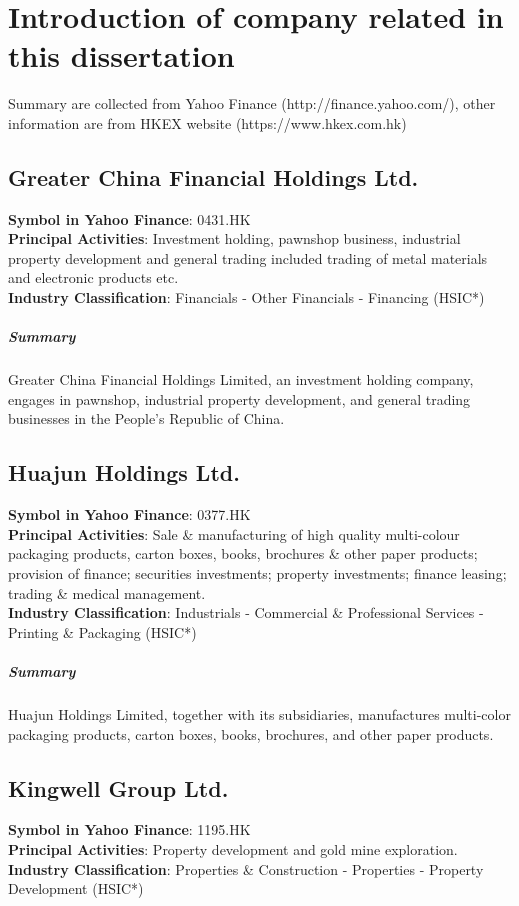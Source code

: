 \chapter{Introduction of company related in this dissertation}
\label{ch:stock_info}

Summary are collected from Yahoo Finance (http://finance.yahoo.com/), other information are from HKEX website (https://www.hkex.com.hk)


\section{Greater China Financial Holdings Ltd.}
\textbf{Symbol in Yahoo Finance}: 0431.HK\\
\textbf{Principal Activities}: Investment holding, pawnshop business, industrial property development and general trading included trading of metal materials and electronic products etc.\\
\textbf{Industry Classification}: Financials - Other Financials - Financing (HSIC*)
\paragraph{Summary}
Greater China Financial Holdings Limited, an investment holding company, engages in pawnshop, industrial property development, and general trading businesses in the People's Republic of China.


\section{Huajun Holdings Ltd.}
\textbf{Symbol in Yahoo Finance}: 0377.HK\\
\textbf{Principal Activities}: Sale \& manufacturing of high quality multi-colour packaging products, carton boxes, books, brochures \& other paper products; provision of finance; securities investments; property investments; finance leasing; trading \& medical management.\\
\textbf{Industry Classification}: Industrials - Commercial \& Professional Services - Printing \& Packaging (HSIC*)
\paragraph{Summary}
Huajun Holdings Limited, together with its subsidiaries, manufactures multi-color packaging products, carton boxes, books, brochures, and other paper products.


\section{Kingwell Group Ltd.}
\textbf{Symbol in Yahoo Finance}: 1195.HK\\
\textbf{Principal Activities}: Property development and gold mine exploration.\\
\textbf{Industry Classification}: Properties \& Construction - Properties - Property Development (HSIC*)

